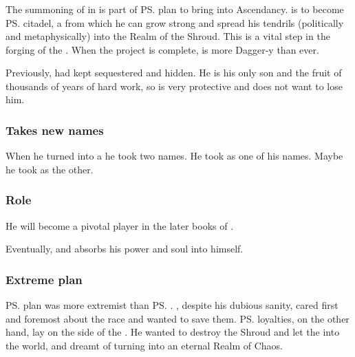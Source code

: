 \subsubsection{\Malcur}
The summoning of \Nithdornazsh in \Malcur is part of \ps{\Secherdamon} plan to bring  into Ascendancy. 
\Nithdornazsh{} is to become \ps{\Vizsherioch} citadel, a \nexus{} from which he can grow strong and spread his tendrils (politically and metaphysically) into the Realm of the Shroud. 
This is a vital step in the forging of the . 
When the \Nithdornazsh{} project is complete, \Vizsherioch{} is more Dagger-y than ever. 

Previously, \Secherdamon{} had kept \Vizsherioch{} sequestered and hidden. 
He is his only son and the fruit of thousands of years of hard work, so \Secherdamon{} is very protective and does not want to lose him. 





\subsubsection{Takes new names}
When he turned into a \dragon he took two names. 
He took  as one of his names.
Maybe he took \quo{\Secherdamon} as the other. 





\subsubsection{Role}
He will become a pivotal player in the later books of \SentinelsofMith.

Eventually,  and \Vizsherioch{} absorbs his power and soul into himself. 





\subsubsection{Extreme plan}
\ps{\Vizsherioch} plan was more extremist than \ps{\Secherdamon}. 
\Secherdamon{}, despite his dubious sanity, cared first and foremost about the \draconian{} race and wanted to save them. 
\ps{\Vizsherioch} loyalties, on the other hand, lay on the side of the \xss. 
He wanted to destroy the Shroud and let the \xss{} into the world, and dreamt of turning \Miith{} into an eternal Realm of Chaos. 

